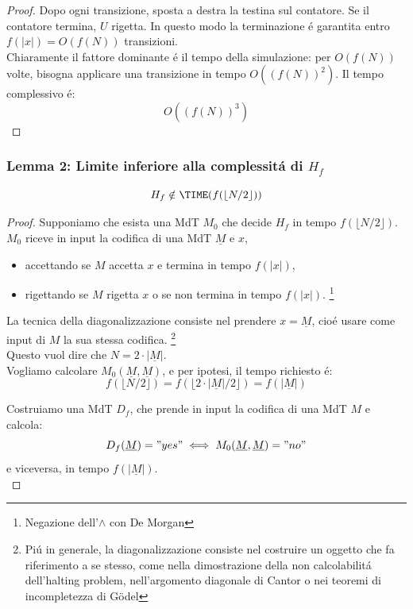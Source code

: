 \begin{proof}
Dopo ogni transizione, sposta a destra la testina sul contatore. 
Se il contatore termina, $U$ rigetta.
In questo modo la terminazione é garantita entro $f(|x|) = O(f(N))$ transizioni.\\

Chiaramente il fattore dominante é il tempo della simulazione: 
per $O(f(N))$ volte, bisogna applicare una transizione in tempo $O((f(N))^2)$. 
Il tempo complessivo é:
\[O((f(N))^3)\]
\end{proof}

\newpage
\subsubsection{Lemma 2: Limite inferiore alla complessitá di $H_f$}
\[H_f \notin \TIME(f(\lfloor N/2 \rfloor))\]
\begin{proof}
Supponiamo che esista una MdT $M_0$ che decide $H_f$ in tempo $f(\lfloor N/2 \rfloor)$. \\
$M_0$ riceve in input la codifica di una MdT $\underline{M}$ e $x$,
\begin{itemize}
    \item accettando se $M$ accetta $x$ e termina in tempo $f(|x|)$,
    \item rigettando se $M$ rigetta $x$ o se non termina in tempo $f(|x|)$. 
        \footnote{Negazione dell'$\land$ con De Morgan}
\end{itemize}

La tecnica della diagonalizzazione consiste nel prendere $x = \underline{M}$, 
cioé usare come input di $M$ la sua stessa codifica. 
\footnote{Piú in generale, la diagonalizzazione consiste nel costruire un oggetto che fa riferimento a se stesso, come nella dimostrazione della non calcolabilitá dell'halting problem, nell'argomento diagonale di Cantor o nei teoremi di incompletezza di Gödel} \\
Questo vuol dire che $N = 2 \cdot |\underline{M}|$. \\

Vogliamo calcolare $M_0(\underline{M}, \underline{M})$, e per ipotesi, il tempo richiesto é:
\[f(\lfloor N/2 \rfloor) = f(\lfloor 2 \cdot |\underline{M}|/2 \rfloor) = f( |\underline{M}| )\]

Costruiamo una MdT $D_f$, che prende in input la codifica di una MdT $M$
e calcola: 
\[D_f(\underline{M}) = "yes" \iff M_0(\underline{M}, \underline{M}) = "no"\] 
e viceversa, in tempo $f(|\underline{M}|)$. \\


\end{proof}
